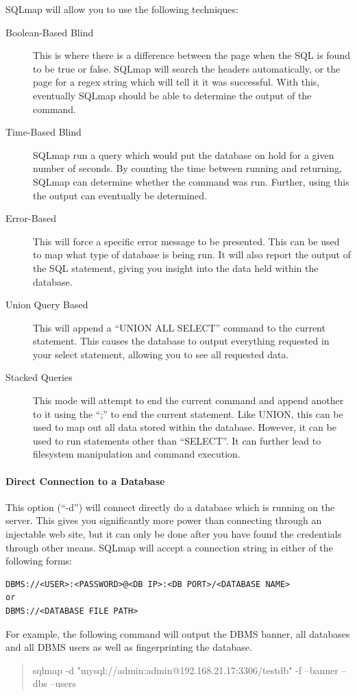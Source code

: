 \documentclass[a4paper,11pt]{report}
\begin{document}
			SQLmap will allow you to use the following techniques:
			\begin{description}
				\item[Boolean-Based Blind] This is where there is a difference between the page when the SQL is found to be true or false. 
					SQLmap will search the headers automatically, or the page for a regex string which will tell it it was successful. 
					With this, eventually SQLmap should be able to determine the output of the command. 
				\item[Time-Based Blind] SQLmap run a query which would put the database on hold for a given number of seconds. 
					By counting the time between running and returning, SQLmap can determine whether the command was run. 
					Further, using this the output can eventually be determined. 
				\item[Error-Based] This will force a specific error message to be presented. 
					This can be used to map what type of database is being run. 
					It will also report the output of the SQL statement, giving you insight into the data held within the database. 
				\item[Union Query Based] This will append a ``UNION ALL SELECT'' command to the current statement. 
					This causes the database to output everything requested in your select statement, allowing you to see all requested data. 
				\item[Stacked Queries] This mode will attempt to end the current command and append another to it using the ``;'' to end the current statement. 
					Like UNION, this can be used to map out all data stored within the database. 
					However, it can be used to run statements other than ``SELECT''. 
					It can further lead to filesystem manipulation and command execution. 
			\end{description}
			\paragraph{Direct Connection to a Database}
				This option (``-d'') will connect directly do a database which is running on the server. 
				This gives you significantly more power than connecting through an injectable web site, but it can only be done after you have found the credentials through other means. 
				SQLmap will accept a connection string in either of the following forms:
				\begin{verbatim}
DBMS://<USER>:<PASSWORD>@<DB IP>:<DB PORT>/<DATABASE NAME>
or
DBMS://<DATABASE FILE PATH>
				\end{verbatim}
				For example, the following command will output the DBMS banner, all databases and all DBMS users as well as fingerprinting the database. 
				\begin{quote}
					sqlmap -d "mysql://admin:admin@192.168.21.17:3306/testdb" -f --banner --dbs --users
				\end{quote}
\end{document}
